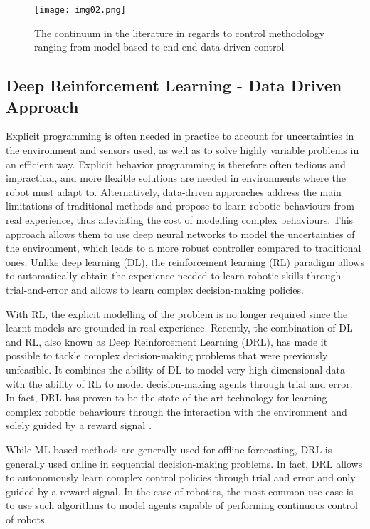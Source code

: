 \begin{figure}[h]
	\centering
	\texttt{[image: img02.png]}
	\captionsetup{width=0.6\linewidth}
	\caption{The continuum in the literature in regards to control
		methodology ranging from model-based to end-end data-driven
		control \cite{thakar2023survey}}
	\label{fig:img02}
\end{figure}



\subsection{Deep Reinforcement Learning - Data Driven Approach}

Explicit programming is often needed in practice to account for uncertainties in the environment and
sensors used, as well as to solve highly variable problems in an efficient way.
Explicit behavior programming is therefore often tedious and impractical, and more flexible solutions
are needed in environments where the robot must adapt to.
Alternatively, data-driven approaches address the main limitations of traditional methods and propose
to learn robotic behaviours from real experience, thus alleviating the cost of modelling complex behaviours.
This approach allows them to use deep neural networks to model the uncertainties of the environment,
which leads to a more robust controller compared to traditional ones.
Unlike deep learning (DL), the reinforcement learning (RL) paradigm allows to automatically obtain the
experience needed to learn robotic skills through trial-and-error and allows to learn complex decision-making
policies.

With RL, the explicit modelling of the problem is no longer required since the learnt models are grounded
in real experience. Recently, the combination of DL and RL, also known as Deep Reinforcement Learning (DRL),
has made it possible to tackle complex decision-making problems that were previously unfeasible. It combines
the ability of DL to model very high dimensional data with the ability of RL to model decision-making agents
through trial and error.
In fact, DRL has proven to be the state-of-the-art technology for learning complex
robotic behaviours through the interaction with the environment and solely guided
by a reward signal \cite{liu2021deep}.

While ML-based methods are generally used for offline forecasting, DRL is generally used online in
sequential decision-making problems. In fact, DRL allows to autonomously learn complex control policies
through trial and error and only guided by a reward signal. In the case of robotics, the most common
use case is to use such algorithms to model agents capable of performing continuous control of robots.


